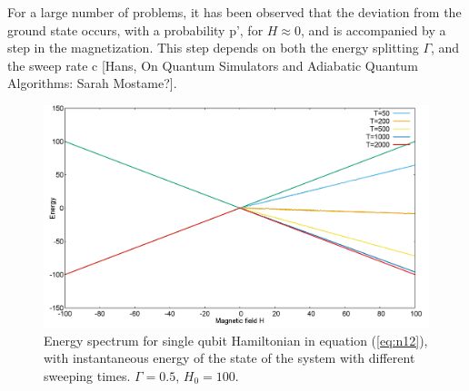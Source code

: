\documentclass[12]{article}
\begin{document}
For a large number of problems, it has been observed that the deviation from the ground state occurs, with a probability p', for $H \approx 0$, and is accompanied by a step in the magnetization. This step depends on both the energy splitting  $\Gamma$, and the sweep rate c [Hans, On Quantum Simulators and Adiabatic Quantum Algorithms: Sarah Mostame?].\\
\begin{figure}[H]
\centering 
\includegraphics[scale=0.3]{EnergySpec_1spin_H100.png}
\caption{Energy spectrum for single qubit Hamiltonian in equation (\ref{eq:n12}), with instantaneous energy of the state of the system with different sweeping times. $\Gamma=0.5$, $H_0=100$.}
\label{fig:lz1}
\end{figure}
\end{document}
